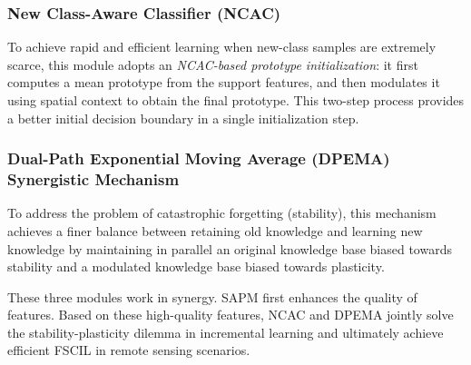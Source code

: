 ﻿\documentclass[letterpaper,journal]{IEEEtran}
\begin{document}
\subsubsection{New Class-Aware Classifier (NCAC)} To achieve rapid and efficient learning when new-class samples are extremely scarce, this module adopts an \emph{NCAC-based prototype initialization}: it first computes a mean prototype from the support features, and then modulates it using spatial context to obtain the final prototype. This two-step process provides a better initial decision boundary in a single initialization step.
\subsubsection{Dual-Path Exponential Moving Average (DPEMA) Synergistic Mechanism} To address the problem of catastrophic forgetting (stability), this mechanism achieves a finer balance between retaining old knowledge and learning new knowledge by maintaining in parallel an original knowledge base biased towards stability and a modulated knowledge base biased towards plasticity.

These three modules work in synergy. SAPM first enhances the quality of features. Based on these high-quality features, NCAC and DPEMA jointly solve the stability-plasticity dilemma in incremental learning and ultimately achieve efficient FSCIL in remote sensing scenarios.
\end{document}

